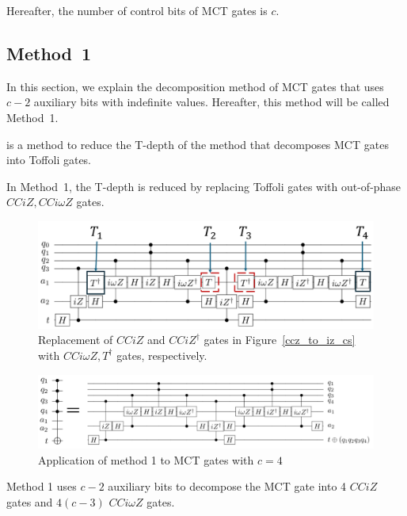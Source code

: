 Hereafter, the number of control bits of MCT gates is $c$.

\subsection{Method~1}
In this section, we explain the decomposition method \cite{abdessaied2016technology} of MCT gates that uses $c-2$ auxiliary bits with indefinite values. Hereafter, this method will be called Method~1.

 is a method to reduce the T-depth of the method \cite{barenco1995elementary} that decomposes MCT gates into Toffoli gates.

In Method~1, the T-depth is reduced by replacing Toffoli gates with out-of-phase $CCiZ, CCi\omega Z$ gates.

\begin{figure}[tbp]
\centering
\includegraphics[width=0.95\linewidth]{img/barenco_iz_to_iomegaz.pdf}
\caption{Replacement of $CCiZ$ and $CCiZ^{\dag}$ gates in Figure~\ref{ccz_to_iz_cs} with $CCi\omega Z, T^{\dag}$ gates, respectively.}

\label{barenco_iz_to_iomegaz}

\end{figure}

\begin{figure}[tbp]

\centering

\includegraphics[width=0.9\columnwidth]{img/techmap.pdf}

\caption{Application of method 1 to MCT gates with $c=4$}

\label{techmap}

\end{figure}

\par
Method 1 uses $c-2$ auxiliary bits to decompose the MCT gate into 4 $CCiZ$ gates and $4(c-3)$ $CCi\omega Z$ gates.

